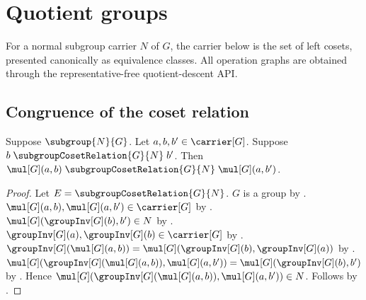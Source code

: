 



\section{Quotient groups}

For a normal subgroup carrier $N$ of $G$, the carrier below is the set of
left cosets, presented canonically as equivalence classes.  All operation
graphs are obtained through the representative-free quotient-descent API.

\subsection{Congruence of the coset relation}

\begin{lemma}\label{subgroup_coset_relation_left_mul}
    Suppose $\subgroup{N}{G}$.
    Let $a,b,b'\in\carrier[G]$.
    Suppose
        $b\mathrel{\subgroupCosetRelation{G}{N}}b'$.
    Then
        $\mul[G](a,b)
            \mathrel{\subgroupCosetRelation{G}{N}}
        \mul[G](a,b')$.
\end{lemma}
\begin{proof}
    Let $E=\subgroupCosetRelation{G}{N}$.
    $G$ is a group by .
    $\mul[G](a,b),\mul[G](a,b')\in\carrier[G]$ by
        .
    $\mul[G](\groupInv[G](b),b')\in N$ by
        .
    $\groupInv[G](a),\groupInv[G](b)\in\carrier[G]$ by
        .
    $\groupInv[G](\mul[G](a,b))=
        \mul[G](\groupInv[G](b),\groupInv[G](a))$ by
        .
    $\mul[G]
        (\groupInv[G](\mul[G](a,b)),\mul[G](a,b'))
        =\mul[G](\groupInv[G](b),b')$ by
        .
    Hence
        $\mul[G]
            (\groupInv[G](\mul[G](a,b)),\mul[G](a,b'))\in N$.
    Follows by .
\end{proof}


